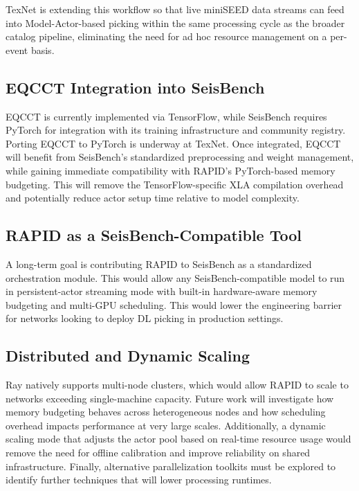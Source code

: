 TexNet is extending this workflow so that live miniSEED data streams can feed into Model-Actor-based picking within the same processing cycle as the broader catalog pipeline, eliminating the need for ad hoc resource management on a per-event basis.

\subsection{EQCCT Integration into SeisBench}

EQCCT is currently implemented via TensorFlow, while SeisBench requires PyTorch for integration with its training infrastructure and community registry. Porting EQCCT to PyTorch is underway at TexNet. Once integrated, EQCCT will benefit from SeisBench’s standardized preprocessing and weight management, while gaining immediate compatibility with RAPID's PyTorch-based memory budgeting. This will remove the TensorFlow-specific XLA compilation overhead and potentially reduce actor setup time relative to model complexity.

\subsection{RAPID as a SeisBench-Compatible Tool}

A long-term goal is contributing RAPID to SeisBench as a standardized orchestration module. This would allow any SeisBench-compatible model to run in persistent-actor streaming mode with built-in hardware-aware memory budgeting and multi-GPU scheduling. This would lower the engineering barrier for networks looking to deploy DL picking in production settings.

\subsection{Distributed and Dynamic Scaling}

Ray natively supports multi-node clusters, which would allow RAPID to scale to networks exceeding single-machine capacity. Future work will investigate how memory budgeting behaves across heterogeneous nodes and how scheduling overhead impacts performance at very large scales. Additionally, a dynamic scaling mode that adjusts the actor pool based on real-time resource usage would remove the need for offline calibration and improve reliability on shared infrastructure. Finally, alternative parallelization toolkits must be explored to identify further techniques that will lower processing runtimes.

